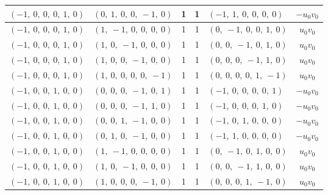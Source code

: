 \documentclass[11pt]{article}
\theoremstyle{definition}
\begin{document}
\begin{longtable}{|l|l|c|c|l|c|}
    \hline
    $\left( -1, \  0, \  0, \  0, \  1, \  0\right)$ & $\left( 0, \  1, \  0, \  0, \  -1, \  0\right)$ & 1 & 1 & $\left( -1, \  1, \  0, \  0, \  0, \  0\right)$ & $- u_{0} v_{0}$ \\
    \hline
    $\left( -1, \  0, \  0, \  0, \  1, \  0\right)$ & $\left( 1, \  -1, \  0, \  0, \  0, \  0\right)$ & 1 & 1 & $\left( 0, \  -1, \  0, \  0, \  1, \  0\right)$ & $u_{0} v_{0}$ \\
    \hline
    $\left( -1, \  0, \  0, \  0, \  1, \  0\right)$ & $\left( 1, \  0, \  -1, \  0, \  0, \  0\right)$ & 1 & 1 & $\left( 0, \  0, \  -1, \  0, \  1, \  0\right)$ & $u_{0} v_{0}$ \\
    \hline
    $\left( -1, \  0, \  0, \  0, \  1, \  0\right)$ & $\left( 1, \  0, \  0, \  -1, \  0, \  0\right)$ & 1 & 1 & $\left( 0, \  0, \  0, \  -1, \  1, \  0\right)$ & $u_{0} v_{0}$ \\
    \hline
    $\left( -1, \  0, \  0, \  0, \  1, \  0\right)$ & $\left( 1, \  0, \  0, \  0, \  0, \  -1\right)$ & 1 & 1 & $\left( 0, \  0, \  0, \  0, \  1, \  -1\right)$ & $u_{0} v_{0}$ \\
    \hline
    $\left( -1, \  0, \  0, \  1, \  0, \  0\right)$ & $\left( 0, \  0, \  0, \  -1, \  0, \  1\right)$ & 1 & 1 & $\left( -1, \  0, \  0, \  0, \  0, \  1\right)$ & $- u_{0} v_{0}$ \\
    \hline
    $\left( -1, \  0, \  0, \  1, \  0, \  0\right)$ & $\left( 0, \  0, \  0, \  -1, \  1, \  0\right)$ & 1 & 1 & $\left( -1, \  0, \  0, \  0, \  1, \  0\right)$ & $- u_{0} v_{0}$ \\
    \hline
    $\left( -1, \  0, \  0, \  1, \  0, \  0\right)$ & $\left( 0, \  0, \  1, \  -1, \  0, \  0\right)$ & 1 & 1 & $\left( -1, \  0, \  1, \  0, \  0, \  0\right)$ & $- u_{0} v_{0}$ \\
    \hline
    $\left( -1, \  0, \  0, \  1, \  0, \  0\right)$ & $\left( 0, \  1, \  0, \  -1, \  0, \  0\right)$ & 1 & 1 & $\left( -1, \  1, \  0, \  0, \  0, \  0\right)$ & $- u_{0} v_{0}$ \\
    \hline
    $\left( -1, \  0, \  0, \  1, \  0, \  0\right)$ & $\left( 1, \  -1, \  0, \  0, \  0, \  0\right)$ & 1 & 1 & $\left( 0, \  -1, \  0, \  1, \  0, \  0\right)$ & $u_{0} v_{0}$ \\
    \hline
    $\left( -1, \  0, \  0, \  1, \  0, \  0\right)$ & $\left( 1, \  0, \  -1, \  0, \  0, \  0\right)$ & 1 & 1 & $\left( 0, \  0, \  -1, \  1, \  0, \  0\right)$ & $u_{0} v_{0}$ \\
    \hline
    $\left( -1, \  0, \  0, \  1, \  0, \  0\right)$ & $\left( 1, \  0, \  0, \  0, \  -1, \  0\right)$ & 1 & 1 & $\left( 0, \  0, \  0, \  1, \  -1, \  0\right)$ & $u_{0} v_{0}$ \\

\end{longtable}
\end{document}
